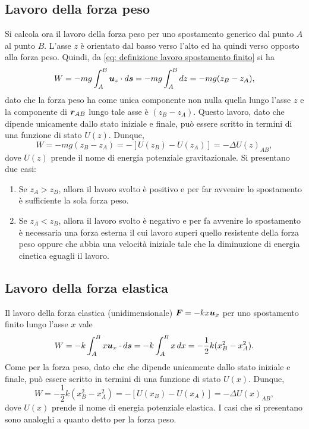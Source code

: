 \subsection{Lavoro della forza peso}
Si calcola ora il lavoro della forza peso per uno spostamento generico dal punto $A$ al punto $B$. L'asse $z$ è orientato dal basso verso l'alto ed ha quindi verso opposto alla forza peso. Quindi, da \eqref{eq: definizione lavoro spostamento finito} si ha
\begin{equation}
    W=-mg\int_A^B\bm{u}_z\cdot d\bm{s}=-mg\int_A^Bdz=-mg(z_B-z_A),
\end{equation}
dato che la forza peso ha come unica componente non nulla quella lungo l'asse $z$ e la componente di $\bm{r}_{AB}$ lungo tale asse è $(z_B-z_A)$. Questo lavoro, dato che dipende unicamente dallo stato iniziale e finale, può essere scritto in termini di una funzione di stato $U(z)$. Dunque,
\begin{equation}
    W=-mg(z_B-z_A)=-[U(z_B)-U(z_A)]=-\Delta U(z)_{AB},
\end{equation}
dove $U(z)$ prende il nome di energia potenziale gravitazionale. 
\newpage
\noindent
Si presentano due casi:
\begin{enumerate}
    \item Se $z_A>z_B$, allora il lavoro svolto è positivo e per far avvenire lo spostamento è sufficiente la sola forza peso.
    \item Se $z_A<z_B$, allora il lavoro svolto è negativo e per fa avvenire lo spostamento è necessaria una forza esterna il cui lavoro superi quello resistente della forza peso oppure che abbia una velocità iniziale tale che la diminuzione di energia cinetica eguagli il lavoro.
\end{enumerate}

\subsection{Lavoro della forza elastica}
Il lavoro della forza elastica (unidimensionale) $\bm{F}=-kx\bm{u}_x$ per uno spostamento finito lungo l'asse $x$ vale
\begin{equation}
    W=-k\int_A^Bx\bm{u}_x\cdot d\bm{s}=-k\int_A^Bx\,dx=-\frac{1}{2}k(x_B^2-x_A^2).
\end{equation}
Come per la forza peso, dato che che dipende unicamente dallo stato iniziale e finale, può essere scritto in termini di una funzione di stato $U(x)$. Dunque, 
\begin{equation}
    W=-\frac{1}{2}k(x_B^2-x_A^2)=-[U(x_B)-U(x_A)]=-\Delta U(x)_{AB},
\end{equation}
dove $U(x)$ prende il nome di energia potenziale elastica. I casi che si presentano sono analoghi a quanto detto per la forza peso. 

